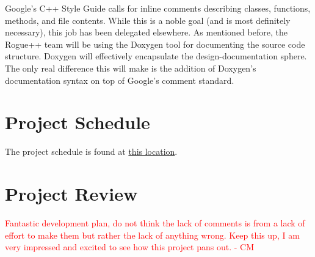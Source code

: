 \documentclass{article}
\begin{document}
Google's C++ Style Guide calls for inline comments describing classes, functions, methods, and file contents.  While this is a noble goal (and is most definitely necessary), this job has been delegated elsewhere.  As mentioned before, the Rogue++ team will be using the Doxygen tool for documenting the source code structure.  Doxygen will effectively encapsulate the design-documentation sphere. The only real difference this will make is the addition of Doxygen's documentation syntax on top of Google's comment standard.

\section{Project Schedule}
\label{schedule_label}

\indent
The project schedule is found at \href{run:../../ProjectSchedule/Rogue.gan}{this location}.

\section{Project Review}

\textcolor{red}{Fantastic development plan, do not think the lack of comments is from a lack of effort to make them but rather the lack of anything wrong. Keep this up, I am very impressed and excited to see how this project pans out. - CM} \\
\end{document}
